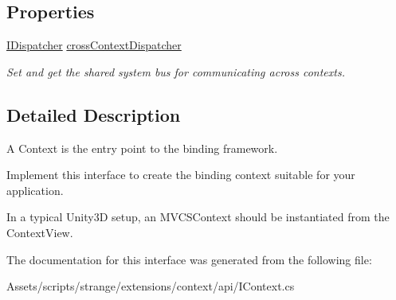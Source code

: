 \subsection*{Properties}
\begin{DoxyCompactItemize}
\item 
\hypertarget{interfacestrange_1_1extensions_1_1context_1_1api_1_1_i_context_ac0e9b15b9639efe7ad58d0b9cfe0445a}{\hyperlink{interfacestrange_1_1extensions_1_1dispatcher_1_1api_1_1_i_dispatcher}{I\-Dispatcher} \hyperlink{interfacestrange_1_1extensions_1_1context_1_1api_1_1_i_context_ac0e9b15b9639efe7ad58d0b9cfe0445a}{cross\-Context\-Dispatcher}}\label{interfacestrange_1_1extensions_1_1context_1_1api_1_1_i_context_ac0e9b15b9639efe7ad58d0b9cfe0445a}

\begin{DoxyCompactList}\small\item\em Set and get the shared system bus for communicating across contexts. \end{DoxyCompactList}\end{DoxyCompactItemize}


\subsection{Detailed Description}
A Context is the entry point to the binding framework. 

Implement this interface to create the binding context suitable for your application.

In a typical Unity3\-D setup, an M\-V\-C\-S\-Context should be instantiated from the Context\-View. 

The documentation for this interface was generated from the following file\-:\begin{DoxyCompactItemize}
\item 
Assets/scripts/strange/extensions/context/api/I\-Context.\-cs\end{DoxyCompactItemize}
